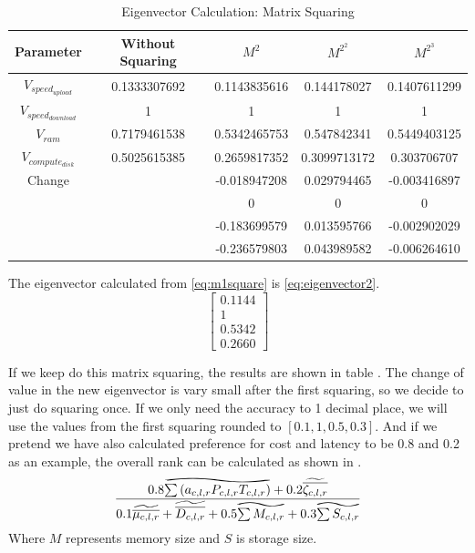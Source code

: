 \begin{table}[ht]
\begin{center}
\caption{Eigenvector Calculation: Matrix Squaring}
\label{table:eigenvecto_mamtrix_squaring}
\begin{tabular}{c|cccc}
\toprule
Parameter                & Without Squaring & $M^{2}$      & $M^{2^{2}}$  & $M^{2^{3}}$\\
\midrule
$V_{speed_{upload}}$     & 0.1333307692     & 0.1143835616 & 0.144178027  & 0.1407611299\\
$V_{speed_{download}}$   & 1                & 1            & 1            & 1 \\
$V_{ram}$                & 0.7179461538     & 0.5342465753 & 0.547842341  & 0.5449403125\\
$V_{compute_{disk}}$     & 0.5025615385     & 0.2659817352 & 0.3099713172 & 0.303706707\\
\hline
Change                   &                  & -0.018947208 & 0.029794465  & -0.003416897\\
                         &                  & 0            & 0            & 0 \\
                         &                  & -0.183699579 & 0.013595766  & -0.002902029\\
                         &                  & -0.236579803 & 0.043989582  & -0.006264610\\
\bottomrule
\end{tabular}
\end{center}
\end{table}

The eigenvector calculated from \eqref{eq:m1square} is \eqref{eq:eigenvector2}.
\begin{equation}
\label{eq:eigenvector2}
\left[ 
\begin{array}{c} 
0.1144 \\ 
1 \\
0.5342 \\
0.2660
\end{array} 
\right] 
\end{equation}

If we keep do this matrix squaring, the results are shown in table .
The change of value in the new eigenvector is vary small after the first squaring, so we decide to just do squaring once. If we only need the accuracy to 1 decimal place, we will use the values from the first squaring rounded to $[0.1, 1, 0.5, 0.3]$.
And if we pretend we have also calculated preference for cost and latency to be 0.8 and 0.2 as an example, the overall rank can be calculated as shown in .
\begin{equation}\label{eq:ratio_example}
\frac{
    0.8 \reallywidetilde {\sum { ( a_{c,l,r} P_{c,l,r} T_{c,l,r} ) } }
    + 0.2 \widetilde{ \overline{ \zeta_{c,l,r} } }
}{
    0.1 \widetilde{ \overline{\mu_{c,l,r}} }
    + \widetilde{ \overline{D_{c,l,r}} }
    + 0.5 \reallywidetilde{ \sum{M_{c,l,r}} }
    + 0.3 \reallywidetilde{ \sum{S_{c,l,r}} }
}
\end{equation}
Where $M$ represents memory size and $S$ is storage size.

